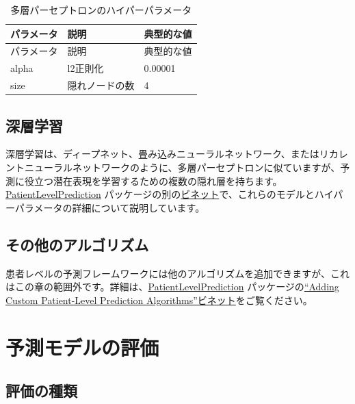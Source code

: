 \documentclass[
  11pt]{book}
\theoremstyle{definition}
\theoremstyle{definition}
\theoremstyle{definition}
\theoremstyle{definition}
\theoremstyle{remark}
\begin{document}
\begin{longtable}[]{@{}lll@{}}
\caption{\label{tab:mpParameters} 多層パーセプトロンのハイパーパラメータ}\tabularnewline
\toprule\noalign{}
パラメータ & 説明 & 典型的な値 \\
\midrule\noalign{}
\endfirsthead
\toprule\noalign{}
パラメータ & 説明 & 典型的な値 \\
\midrule\noalign{}
\endhead
\bottomrule\noalign{}
\endlastfoot
alpha & l2正則化 & 0.00001 \\
size & 隠れノードの数 & 4 \\
\end{longtable}

\subsection{深層学習}\label{ux6df1ux5c64ux5b66ux7fd2}

深層学習は、ディープネット、畳み込みニューラルネットワーク、またはリカレントニューラルネットワークのように、多層パーセプトロンに似ていますが、予測に役立つ潜在表現を学習するための複数の隠れ層を持ちます。\href{https://ohdsi.github.io/PatientLevelPrediction/}{PatientLevelPrediction} パッケージの別の\href{https://ohdsi.github.io/PatientLevelPrediction/articles/BuildingDeepLearningModels.html}{ビネット}で、これらのモデルとハイパーパラメータの詳細について説明しています。   

\subsection{その他のアルゴリズム}\label{ux305dux306eux4ed6ux306eux30a2ux30ebux30b4ux30eaux30baux30e0}

患者レベルの予測フレームワークには他のアルゴリズムを追加できますが、これはこの章の範囲外です。詳細は、\href{https://ohdsi.github.io/PatientLevelPrediction/}{PatientLevelPrediction} パッケージの\href{https://ohdsi.github.io/PatientLevelPrediction/articles/AddingCustomAlgorithms.html}{``Adding Custom Patient-Level Prediction Algorithms''ビネット}をご覧ください。

\section{予測モデルの評価}\label{ux4e88ux6e2cux30e2ux30c7ux30ebux306eux8a55ux4fa1}

\subsection{評価の種類}\label{ux8a55ux4fa1ux306eux7a2eux985e}
\end{document}
